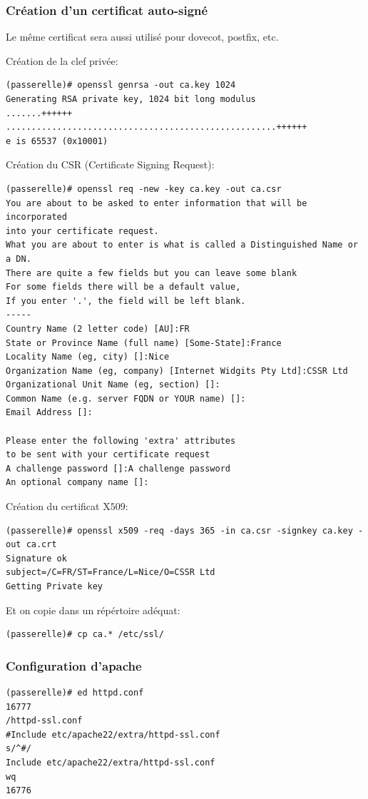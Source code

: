 \documentclass[a4paper]{article}
\begin{document}
\subsubsection{Création d'un certificat auto-signé}
Le même certificat sera aussi utilisé pour dovecot, postfix, etc.

Création de la clef privée:
\begin{verbatim}
(passerelle)# openssl genrsa -out ca.key 1024
Generating RSA private key, 1024 bit long modulus
.......++++++
.....................................................++++++
e is 65537 (0x10001)
\end{verbatim}

Création du CSR (Certificate Signing Request):
\begin{verbatim}
(passerelle)# openssl req -new -key ca.key -out ca.csr
You are about to be asked to enter information that will be incorporated
into your certificate request.
What you are about to enter is what is called a Distinguished Name or a DN.
There are quite a few fields but you can leave some blank
For some fields there will be a default value,
If you enter '.', the field will be left blank.
-----
Country Name (2 letter code) [AU]:FR
State or Province Name (full name) [Some-State]:France
Locality Name (eg, city) []:Nice
Organization Name (eg, company) [Internet Widgits Pty Ltd]:CSSR Ltd
Organizational Unit Name (eg, section) []:
Common Name (e.g. server FQDN or YOUR name) []:
Email Address []:

Please enter the following 'extra' attributes
to be sent with your certificate request
A challenge password []:A challenge password
An optional company name []:
\end{verbatim}

Création du certificat X$509$:
\begin{verbatim}
(passerelle)# openssl x509 -req -days 365 -in ca.csr -signkey ca.key -out ca.crt
Signature ok
subject=/C=FR/ST=France/L=Nice/O=CSSR Ltd
Getting Private key
\end{verbatim}

Et on copie dans un répértoire adéquat:
\begin{verbatim}
(passerelle)# cp ca.* /etc/ssl/
\end{verbatim}

\subsubsection{Configuration d'apache}

\begin{verbatim}
(passerelle)# ed httpd.conf 
16777
/httpd-ssl.conf
#Include etc/apache22/extra/httpd-ssl.conf
s/^#/
Include etc/apache22/extra/httpd-ssl.conf
wq
16776
\end{verbatim}
\end{document}
